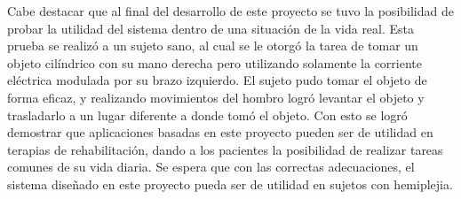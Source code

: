 Cabe destacar que al final del desarrollo de este proyecto se tuvo la posibilidad de probar la utilidad del sistema dentro de una situación de la vida real. Esta prueba se realizó a un sujeto sano, al cual se le otorgó la tarea de tomar un objeto cilíndrico con su mano derecha pero utilizando solamente la corriente eléctrica modulada por su brazo izquierdo. El sujeto pudo tomar el objeto de forma eficaz, y realizando movimientos del hombro logró levantar el objeto y trasladarlo a un lugar diferente a donde tomó el objeto. Con esto se logró demostrar que aplicaciones basadas en este proyecto pueden ser de utilidad en terapias de rehabilitación, dando a los pacientes la posibilidad de realizar tareas comunes de su vida diaria. Se espera que con las correctas adecuaciones, el sistema diseñado en este proyecto pueda ser de utilidad en sujetos con hemiplejia.

